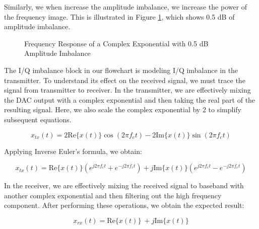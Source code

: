 \documentclass{article}
\begin{document}
Similarly, we when increase the amplitude imbalance, we increase the power of the frequency image. This is illustrated in Figure \ref{fig::iq_imbalance_0p5_mag_0_phase_freq}, which shows 0.5 dB of amplitude imbalance.
 
\begin{figure}[H]
	\centerline{}
	\caption{Frequency Response of a Complex Exponential with 0.5 dB Amplitude Imbalance}
	\label{fig::iq_imbalance_0p5_mag_0_phase_freq}
\end{figure}

The I/Q imbalance block in our flowchart is modeling I/Q imbalance in the transmitter. To understand its effect on the received signal, we must trace the signal from transmitter to receiver. In the transmitter, we are effectively mixing the DAC output with a complex exponential and then taking the real part of the resulting signal. Here, we also scale the complex exponential by 2 to simplify subsequent equations.

\begin{equation}
	x_{tx}(t) = 2\text{Re}\{x(t)\}\cos(2{\pi}f_ct) - 2\text{Im}\{x(t)\}\sin(2{\pi}f_ct)
\end{equation}

Applying Inverse Euler's formula, we obtain:

\begin{equation}
	x_{tx}(t) = \text{Re}\{x(t)\}(e^{j2{\pi}f_ct} + e^{-j2{\pi}f_ct}) + j\text{Im}\{x(t)\}(e^{j2{\pi}f_ct} - e^{-j2{\pi}f_ct})
\end{equation}

In the receiver, we are effectively mixing the received signal to baseband with another complex exponential and then filtering out the high frequency component. After performing these operations, we obtain the expected result:
 
\begin{equation}
	x_{rx}(t) = \text{Re}\{x(t)\}\ + j\text{Im}\{x(t)\}
\end{equation}
\end{document}
